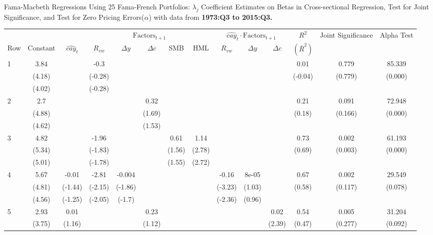 \documentclass[12pt]{article}
\begin{document}
\begin{landscape}
\begin{threeparttable}[htbp]
\centering
\label{table:new}
\caption{  Fama-Macbeth Regressions Using 25 Fama-French Portfolios: $\lambda_j$ Coefficient Estimates on Betas in Cross-sectional Regression,  Test for Joint Significance, and Test for Zero Pricing Errors($\alpha$) with data from \textbf{1973:Q3 to 2015:Q3. }} 
\begin{tabular}{lccccccccccccc}
  \hline
  \hline
   & &  & \multicolumn{5}{c}{$\text{Factors}_{t+1}$}  & \multicolumn{3}{c}{$\widehat{cay}_t \cdot \text{Factors}_{t+1}$} & $R^2$ & \multirow{2}{2cm}{Joint Significance} & \multirow{2}{*}{Alpha Test } \\ \cmidrule(lr){4-8} \cmidrule(lr){9-11}
 Row & Constant & $\widehat{cay}_t$ & $R_{vw}$ & $\Delta y$ & $\Delta c$ & SMB & HML & $R_{vw}$  & $\Delta y$ & $\Delta c$ & $(\bar{R}^2)$ & & \\ \midrule
1 & 3.84 &  & -0.3 &  &  &  &  &  &  &  & 0.01 & 0.779 & 85.339 \\ 
   & (4.18) &  & (-0.28) &  &  &  &  &  &  &  & (-0.04) & (0.779) & (0.000) \\ 
   & (4.02) &  & (-0.28) &  &  &  &  &  &  &  &  &  &  \\ 
  2 & 2.7 &  &  &  & 0.32 &  &  &  &  &  & 0.21 & 0.091 & 72.948 \\ 
   & (4.88) &  &  &  & (1.69) &  &  &  &  &  & (0.18) & (0.166) & (0.000) \\ 
   & (4.62) &  &  &  & (1.53) &  &  &  &  &  &  &  &  \\ 
  3 & 4.82 &  & -1.96 &  &  & 0.61 & 1.14 &  &  &  & 0.73 & 0.002 & 61.193 \\ 
   & (5.34) &  & (-1.83) &  &  & (1.56) & (2.78) &  &  &  & (0.69) & (0.003) & (0.000) \\ 
   & (5.01) &  & (-1.78) &  &  & (1.55) & (2.72) &  &  &  &  &  &  \\ 
  4 & 5.67 & -0.01 & -2.81 & -0.004 &  &  &  & -0.16 & 8e-05 &  & 0.67 & 0.002 & 29.549 \\ 
   & (4.81) & (-1.44) & (-2.15) & (-1.86) &  &  &  & (-3.23) & (1.03) &  & (0.58) & (0.117) & (0.078) \\ 
   & (4.56) & (-1.25) & (-2.05) & (-1.7) &  &  &  & (-2.36) & (0.96) &  &  &  &  \\ 
  5 & 2.93 & 0.01 &  &  & 0.23 &  &  &  &  & 0.02 & 0.54 & 0.005 & 31.204 \\ 
   & (3.75) & (1.16) &  &  & (1.12) &  &  &  &  & (2.39) & (0.47) & (0.277) & (0.092) \\ 

\end{tabular}
\end{threeparttable}
\end{landscape}
\end{document}
